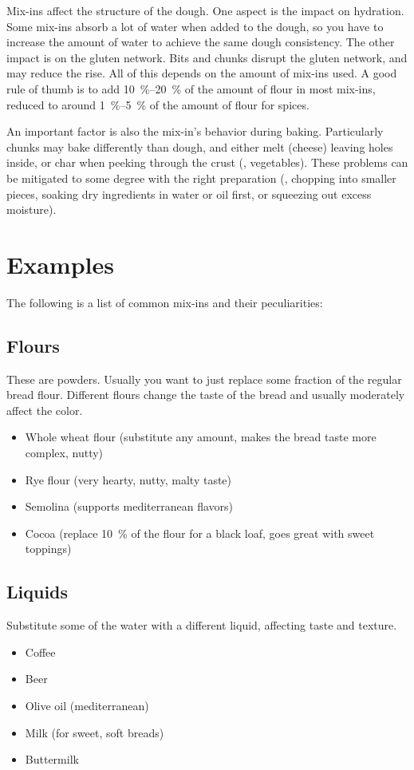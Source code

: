 Mix-ins affect the structure of the dough. One aspect is the impact on
hydration. Some mix-ins absorb a lot of water when added to the dough, so you
have to increase the amount of water to achieve the same dough consistency.
The other impact is on the gluten network. Bits and chunks disrupt the gluten
network, and may reduce the rise. All of this depends on the amount of mix-ins
used. A good rule of thumb is to add \qtyrange{10}{20}{\percent} of the amount
of flour in most mix-ins, reduced to around \qtyrange{1}{5}{\percent} of the
amount of flour for spices.

An important factor is also the mix-in's behavior during baking. Particularly
chunks may bake differently than dough, and either melt (cheese) leaving holes
inside, or char when peeking through the crust (\eg, vegetables). These
problems can be mitigated to some degree with the right preparation (\eg,
chopping into smaller pieces, soaking dry ingredients in water or oil first,
or squeezing out excess moisture).

\section{Examples}

The following is a list of common mix-ins and their peculiarities:

\subsection{Flours}
These are powders. Usually you want to just replace some fraction of the
regular bread flour. Different flours change the taste of the bread and
usually moderately affect the color.
\begin{itemize}
  \item Whole wheat flour (substitute any amount, makes the bread taste more
      complex, nutty)
  \item Rye flour (very hearty, nutty, malty taste)
  \item Semolina (supports mediterranean flavors)
  \item Cocoa (replace \qty{10}{\percent} of the flour for a black loaf, goes
      great with sweet toppings)
\end{itemize}

\subsection{Liquids}
Substitute some of the water with a different liquid, affecting taste and
texture.
\begin{itemize}
  \item Coffee
  \item Beer
  \item Olive oil (mediterranean)
  \item Milk (for sweet, soft breads)
  \item Buttermilk
\end{itemize}

